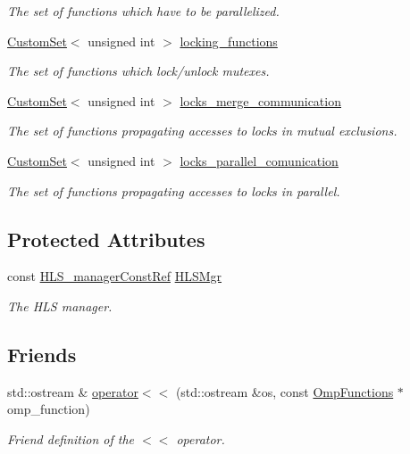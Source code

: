 \begin{DoxyCompactItemize}
\begin{DoxyCompactList}\small\item\em The set of functions which have to be parallelized. \end{DoxyCompactList}\item 
\hyperlink{custom__set_8hpp_a615bc2f42fc38a4bb1790d12c759e86f}{Custom\+Set}$<$ unsigned int $>$ \hyperlink{classOmpFunctions_a739bd58cfaf8af50e4359b78f5e310b2}{locking\+\_\+functions}
\begin{DoxyCompactList}\small\item\em The set of functions which lock/unlock mutexes. \end{DoxyCompactList}\item 
\hyperlink{custom__set_8hpp_a615bc2f42fc38a4bb1790d12c759e86f}{Custom\+Set}$<$ unsigned int $>$ \hyperlink{classOmpFunctions_a8e7758f4f8eccd4a2c67a9f486c1baae}{locks\+\_\+merge\+\_\+communication}
\begin{DoxyCompactList}\small\item\em The set of functions propagating accesses to locks in mutual exclusions. \end{DoxyCompactList}\item 
\hyperlink{custom__set_8hpp_a615bc2f42fc38a4bb1790d12c759e86f}{Custom\+Set}$<$ unsigned int $>$ \hyperlink{classOmpFunctions_a25fc0c74066a9a8caf31003fbe9b5413}{locks\+\_\+parallel\+\_\+comunication}
\begin{DoxyCompactList}\small\item\em The set of functions propagating accesses to locks in parallel. \end{DoxyCompactList}\end{DoxyCompactItemize}
\subsection*{Protected Attributes}
\begin{DoxyCompactItemize}
\item 
const \hyperlink{hls__manager_8hpp_a1b481383e3beabc89bd7562ae672dd8c}{H\+L\+S\+\_\+manager\+Const\+Ref} \hyperlink{classOmpFunctions_ac4f7ea9ae8c6f4ba3858cdf2cc7ed986}{H\+L\+S\+Mgr}
\begin{DoxyCompactList}\small\item\em The H\+LS manager. \end{DoxyCompactList}\end{DoxyCompactItemize}
\subsection*{Friends}
\begin{DoxyCompactItemize}
\item 
std\+::ostream \& \hyperlink{classOmpFunctions_a364f56c8c8c4a93767162e57841f4b79}{operator$<$$<$} (std\+::ostream \&os, const \hyperlink{classOmpFunctions}{Omp\+Functions} $\ast$omp\+\_\+function)
\begin{DoxyCompactList}\small\item\em Friend definition of the $<$$<$ operator. \end{DoxyCompactList}\end{DoxyCompactItemize}


